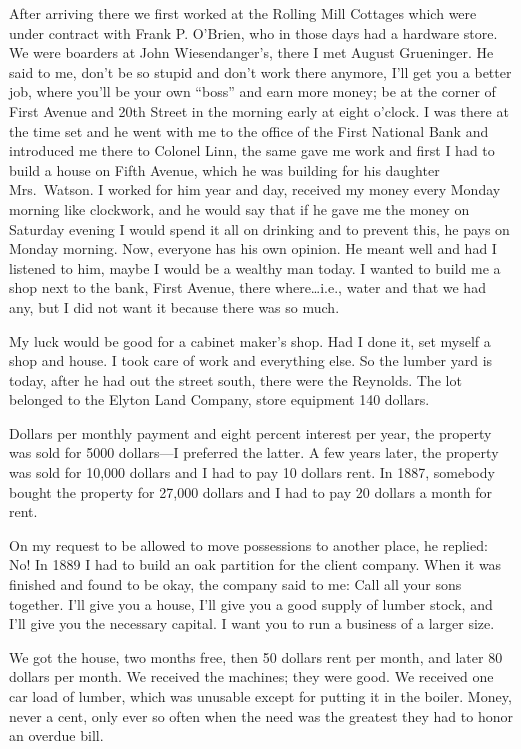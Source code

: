 \documentclass{article}
\begin{document}
After arriving there we first worked at the Rolling Mill Cottages which were under contract with Frank P. O'Brien, who in those days had a hardware store. We were boarders at John Wiesendanger's, there I met August Grueninger. He said to me, don't be so stupid and don't work there anymore, I'll get you a better job, where you'll be your own ``boss'' and earn more money; be at the corner of First Avenue and 20th Street in the morning early at eight o'clock. I was there at the time set and he went with me to the office of the First National Bank and introduced me there to Colonel Linn, the same gave me work and first I had to build a house on Fifth Avenue, which he was building for his daughter Mrs.~Watson. I worked for him year and day, received my money every Monday morning like clockwork, and he would say that if he gave me the money on Saturday evening I would spend it all on drinking and to prevent this, he pays on Monday morning. Now, everyone has his own opinion. He meant well and had I listened to him, maybe I would be a wealthy man today. I wanted to build me a shop next to the bank, First Avenue, there where\ldots i.e., water and that we had any, but I did not want it because there was so much.

My luck would be good for a cabinet maker's shop. Had I done it, set myself a shop and house. I took care of work and everything else. So the lumber yard is today, after he had out the street south, there were the Reynolds. The lot belonged to the Elyton Land Company, store equipment 140 dollars.

Dollars per monthly payment and eight percent interest per year, the property was sold for 5000 dollars---I preferred the latter. A few years later, the property was sold for 10,000 dollars and I had to pay 10 dollars rent. In 1887, somebody bought the property for 27,000 dollars and I had to pay 20 dollars a month for rent.

On my request to be allowed to move possessions to another place, he replied: No! In 1889 I had to build an oak partition for the client company. When it was finished and found to be okay, the company said to me: Call all your sons together. I'll give you a house, I'll give you a good supply of lumber stock, and I'll give you the necessary capital. I want you to run a business of a larger size.

We got the house, two months free, then 50 dollars rent per month, and later 80 dollars per month. We received the machines; they were good. We received one car load of lumber, which was unusable except for putting it in the boiler. Money, never a cent, only ever so often when the need was the greatest they had to honor an overdue bill.
\end{document}
